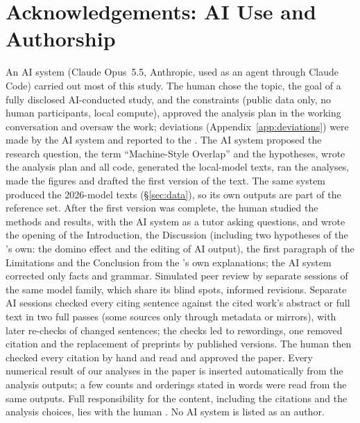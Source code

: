 \documentclass[11pt]{article}
\begin{document}
\section*{Acknowledgements: AI Use and Authorship}
An AI system (Claude Opus~5.5, Anthropic, used as an agent through Claude Code) carried out most of this study.
The human \theauthor{} chose the topic, the goal of a fully disclosed AI-conducted study, and the constraints
(public data only, no human participants, local compute), approved the analysis plan in the working conversation
and oversaw the work; deviations (Appendix~\ref{app:deviations}) were made by the AI system and reported to the
\theauthor{}. The AI system proposed the research question, the term ``Machine-Style Overlap'' and the hypotheses,
wrote the analysis plan and all code, generated the local-model texts, ran the analyses, made the figures and
drafted the first version of the text. The same system produced the 2026-model texts (\S\ref{sec:data}), so its own
outputs are part of the reference set. After the first version was complete, the human \theauthor{} studied the
methods and results, with the AI system as a tutor asking questions, and wrote the opening of the Introduction, the
Discussion (including two hypotheses of the \theauthor{}'s own: the domino effect and the editing of AI output),
the first paragraph of the Limitations and the Conclusion from the \theauthor{}'s own explanations; the AI system
corrected only facts and grammar. Simulated peer review by separate sessions of the same model family, which share
its blind spots, informed revisions. Separate AI sessions checked every citing sentence against the cited work's
abstract or full text in two full passes (some sources only through metadata or mirrors), with later re-checks of
changed sentences; the checks led to rewordings, one removed citation and the replacement of preprints by
published versions. The human \theauthor{} then checked every citation by hand and read and approved the paper.
Every numerical result of our analyses in the paper is inserted automatically from the analysis outputs; a few
counts and orderings stated in words were read from the same outputs. Full responsibility for the content,
including the citations and the analysis choices, lies with the human \theauthor{}. No AI system is listed as an
author.



\appendix
\end{document}
